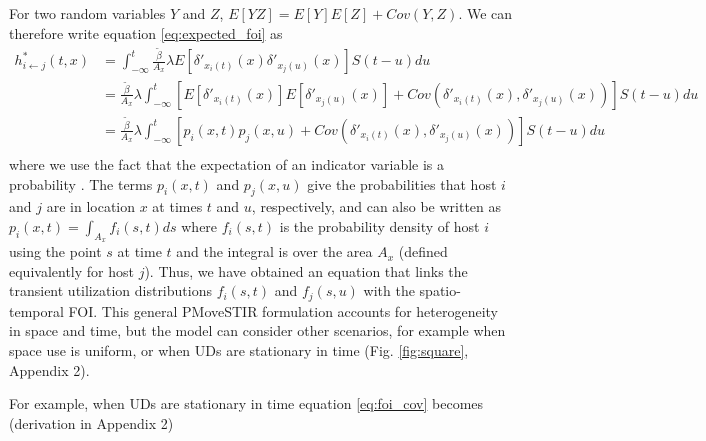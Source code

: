 \documentclass[letterpaper]{article}
\begin{document}
For two random variables $Y$ and $Z$, $E[YZ] = E[Y]E[Z] + Cov(Y, Z)$.  We can therefore write equation \ref{eq:expected_foi} as
\begin{equation}
    \begin{aligned}
        h^*_{i \leftarrow j}(t, x) &= \int_{-\infty}^{t} \frac{\tilde{\beta}}{A_x} \lambda E[\delta'_{x_i(t)}(x) \delta'_{x_j(u)}(x)] S(t - u) du \\
        &= \frac{\tilde{\beta}}{A_x} \lambda \int_{-\infty}^{t} [E[\delta'_{x_i(t)}(x)] E[\delta'_{x_j(u)}(x)] + Cov(\delta'_{x_i(t)}(x), \delta'_{x_j(u)}(x))] S(t - u) du \\
        &= \frac{\tilde{\beta}}{A_x} \lambda \int_{-\infty}^{t} [p_i(x, t) p_j(x, u) + Cov(\delta'_{x_i(t)}(x), \delta'_{x_j(u)}(x))] S(t - u) du \\
    \end{aligned}
    \label{eq:foi_cov}
\end{equation}
where we use the fact that the expectation of an indicator variable is a probability \citep{Grimmett2001}. The terms $p_i(x, t)$ and $p_j(x,u)$ give the probabilities that host $i$ and $j$ are in location $x$ at times $t$ and $u$, respectively, and can also be written as $p_i(x, t) = \int_{A_x} f_i(s, t) ds$ where $f_i(s, t)$ is the probability density of host $i$ using the point $s$ at time $t$ and the integral is over the area $A_x$ (defined equivalently for host $j$). Thus, we have obtained an equation that links the transient utilization distributions $f_i(s, t)$ and $f_j(s, u)$ with the spatio-temporal FOI.
This general PMoveSTIR formulation accounts for heterogeneity in space and time, but the model can consider other scenarios, for example when space use is uniform, or when UDs are stationary in time  (Fig. \ref{fig:square}, Appendix 2). 

For example, when UDs are stationary in time equation \ref{eq:foi_cov} becomes (derivation in Appendix 2)
\end{document}
